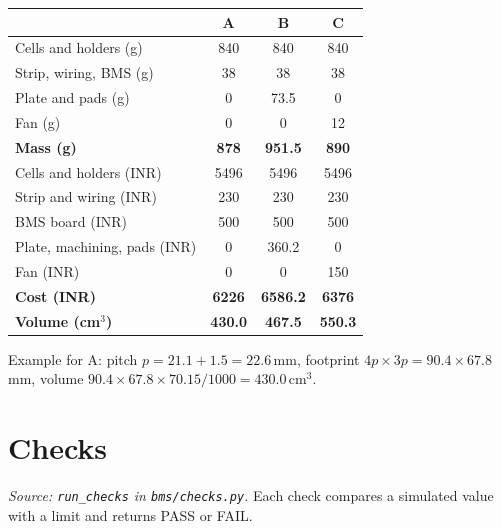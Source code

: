 \documentclass[11pt,a4paper]{article}
\begin{document}
\begin{center}
\begin{tabular}{@{}lccc@{}}
\toprule
 & A & B & C \\
\midrule
Cells and holders (g) & 840 & 840 & 840 \\
Strip, wiring, BMS (g) & 38 & 38 & 38 \\
Plate and pads (g) & 0 & 73.5 & 0 \\
Fan (g) & 0 & 0 & 12 \\
\textbf{Mass (g)} & \textbf{878} & \textbf{951.5} & \textbf{890} \\
\midrule
Cells and holders (INR) & 5496 & 5496 & 5496 \\
Strip and wiring (INR) & 230 & 230 & 230 \\
BMS board (INR) & 500 & 500 & 500 \\
Plate, machining, pads (INR) & 0 & 360.2 & 0 \\
Fan (INR) & 0 & 0 & 150 \\
\textbf{Cost (INR)} & \textbf{6226} & \textbf{6586.2} & \textbf{6376} \\
\midrule
\textbf{Volume (cm$^3$)} & \textbf{430.0} & \textbf{467.5} & \textbf{550.3} \\
\bottomrule
\end{tabular}
\end{center}
Example for A: pitch $p=21.1+1.5=22.6$\,mm, footprint $4p\times3p=90.4\times67.8$\,mm, volume $90.4\times67.8\times70.15/1000=430.0$\,cm$^3$.

\section{Checks}\label{sec:checks}
\emph{Source: \texttt{run\_checks} in \texttt{bms/checks.py}.} Each check compares a simulated value with a limit and returns PASS or FAIL.
\end{document}
